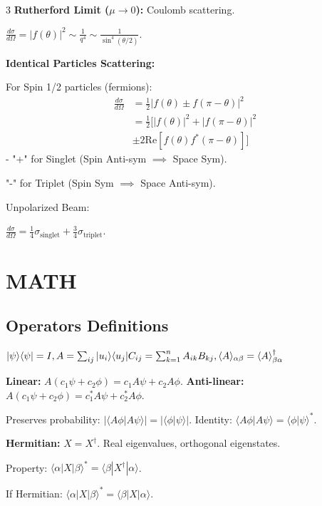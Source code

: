 \documentclass[10pt,a4paper]{article}
\begin{document}
\begin{multicols*}{3}
\textbf{Rutherford Limit ($\mu \to 0$):} Coulomb scattering.

$\frac{d\sigma}{d\Omega} = |f(\theta)|^2 \sim \frac{1}{q^4} \sim \frac{1}{\sin^4(\theta/2)}$.

\textbf{Identical Particles Scattering:}

For Spin 1/2 particles (fermions):
\begin{align*}
    \frac{d\sigma}{d\Omega} &= \frac{1}{2} |f(\theta) \pm f(\pi-\theta)|^2 \\
    &= \frac{1}{2} [ |f(\theta)|^2 + |f(\pi-\theta)|^2 \\ &\pm 2\text{Re}[f(\theta)f^*(\pi-\theta)] ]
\end{align*}
- "+" for Singlet (Spin Anti-sym $\implies$ Space Sym).

"-" for Triplet (Spin Sym $\implies$ Space Anti-sym).

Unpolarized Beam: 

$\frac{d\sigma}{d\Omega} = \frac{1}{4}\sigma_{\text{singlet}} + \frac{3}{4}\sigma_{\text{triplet}}$.


\section*{MATH}

\subsection*{Operators Definitions}

$|\psi\rangle\langle\psi|=I, A = \sum_{ij}|u_i\rangle\langle u_j| \\
C_{ij} = \sum_{k=1}^{n} A_{ik} B_{kj}, \langle A\rangle_{\alpha\beta}=\langle A\rangle^\dagger_{\beta\alpha}$

\textbf{Linear:} $A(c_1\psi + c_2\phi) = c_1 A\psi + c_2 A\phi$.
\textbf{Anti-linear:} $A(c_1\psi + c_2\phi) = c_1^* A\psi + c_2^* A\phi$.

Preserves probability: $|\langle A\phi | A\psi \rangle| = |\langle \phi | \psi \rangle|$.
Identity: $\langle A\phi | A\psi \rangle = \langle \phi | \psi \rangle^*$.

\textbf{Hermitian:} $X = X^\dagger$. Real eigenvalues, orthogonal eigenstates.

Property: $\langle \alpha | X | \beta \rangle^* = \langle \beta | X^\dagger | \alpha \rangle$.

If Hermitian: $\langle \alpha | X | \beta \rangle^* = \langle \beta | X | \alpha \rangle$.


\end{multicols*}
\end{document}
